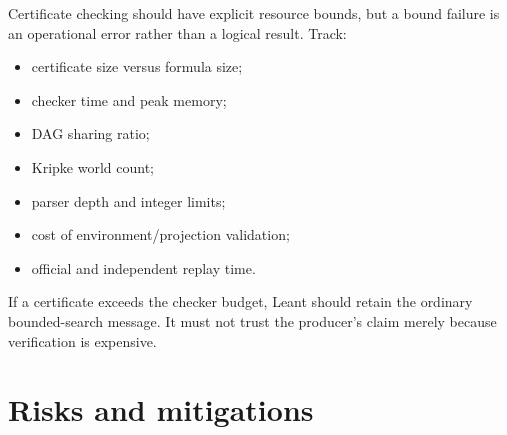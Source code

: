 \documentclass[11pt,letterpaper,openany]{report}
\theoremstyle{definition}
\theoremstyle{remark}
\begin{document}
Certificate checking should have explicit resource bounds, but a bound failure is an operational error rather than a logical result. Track:

\begin{itemize}
\item certificate size versus formula size;
\item checker time and peak memory;
\item DAG sharing ratio;
\item Kripke world count;
\item parser depth and integer limits;
\item cost of environment/projection validation;
\item official and independent replay time.
\end{itemize}

If a certificate exceeds the checker budget, Leant should retain the ordinary bounded-search message. It must not trust the producer's claim merely because verification is expensive.

\chapter{Risks and mitigations}
\label{ch:risks}
\end{document}
